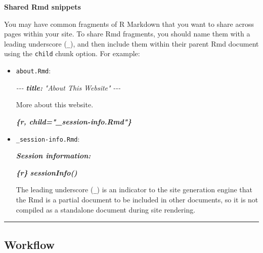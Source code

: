 \documentclass[
  a4paper,
  twoside,
  openright]{book}
\newenvironment{Shaded}{\begin{snugshade}}{\end{snugshade}}
\newcommand{\AnnotationTok}[1]{\textcolor[rgb]{0.56,0.35,0.01}{\textbf{\textit{#1}}}}
\newcommand{\CommentTok}[1]{\textcolor[rgb]{0.56,0.35,0.01}{\textit{#1}}}
\newcommand{\InformationTok}[1]{\textcolor[rgb]{0.56,0.35,0.01}{\textbf{\textit{#1}}}}
\newcommand{\NormalTok}[1]{#1}
\theoremstyle{definition}
\theoremstyle{definition}
\theoremstyle{definition}
\theoremstyle{definition}
\theoremstyle{remark}
\begin{document}
\textbf{Shared Rmd snippets}

You may have common fragments of R Markdown that you want to share across pages within your site. To share Rmd fragments, you should name them with a leading underscore (\texttt{\_}), and then include them within their parent Rmd document using the \texttt{child} chunk option. For example:

\begin{itemize}
\item
  \texttt{about.Rmd}:

\begin{Shaded}
\begin{Highlighting}[]
\CommentTok{{-}{-}{-}}
\AnnotationTok{title:}\CommentTok{ "About This Website"}
\CommentTok{{-}{-}{-}}

\NormalTok{More about this website.}

\InformationTok{\textasciigrave{}\textasciigrave{}\textasciigrave{}\{r, child="\_session{-}info.Rmd"\}}
\InformationTok{\textasciigrave{}\textasciigrave{}\textasciigrave{}}
\end{Highlighting}
\end{Shaded}
\item
  \texttt{\_session-info.Rmd}:

\begin{Shaded}
\begin{Highlighting}[]
\AnnotationTok{Session information:}

\InformationTok{\textasciigrave{}\textasciigrave{}\textasciigrave{}\{r\}}
\InformationTok{sessionInfo()}
\InformationTok{\textasciigrave{}\textasciigrave{}\textasciigrave{}}
\end{Highlighting}
\end{Shaded}

  The leading underscore (\texttt{\_}) is an indicator to the site generation engine that the Rmd is a partial document to be included in other documents, so it is not compiled as a standalone document during site rendering.
\end{itemize}

\begin{center}\rule{0.5\linewidth}{0.5pt}\end{center}

\subsection*{Workflow}\label{workflow}
\end{document}
